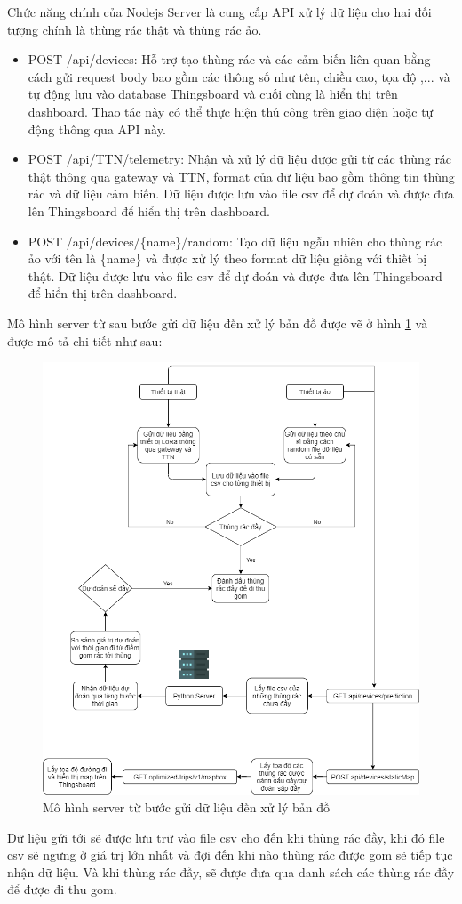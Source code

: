 Chức năng chính của Nodejs Server là cung cấp API xử lý dữ liệu cho hai đối tượng chính là thùng rác thật và thùng rác ảo.
\begin{itemize}
    \item POST /api/devices: Hỗ trợ tạo thùng rác và các cảm biến liên quan bằng cách gửi request body bao gồm các thông số như tên, chiều cao, tọa độ ,... và tự động lưu vào database Thingsboard và cuối cùng là hiển thị trên dashboard. Thao tác này có thể thực hiện thủ công trên giao diện hoặc tự động thông qua API này.
    \item POST /api/TTN/telemetry: Nhận và xử lý dữ liệu được gửi từ các thùng rác thật thông qua gateway và TTN, format của dữ liệu bao gồm thông tin thùng rác và dữ liệu cảm biến. Dữ liệu được lưu vào file csv để dự đoán và được đưa lên Thingsboard để hiển thị trên dashboard.
    \item POST /api/devices/\{name\}/random: Tạo dữ liệu ngẫu nhiên cho thùng rác ảo với tên là \{name\} và được xử lý theo format dữ liệu giống với thiết bị thật. Dữ liệu được lưu vào file csv để dự đoán và được đưa lên Thingsboard để hiển thị trên dashboard.
\end{itemize}

Mô hình server từ sau bước gửi dữ liệu đến xử lý bản đồ được vẽ ở hình \ref{fig:chart_server2} và được mô tả chi tiết như sau:
\begin{figure}[H]
    \centering
    \includegraphics[width=\textwidth]{images/Khanh/Nodejs/Chart_server2.png}
    \caption{Mô hình server từ bước gửi dữ liệu đến xử lý bản đồ}
    \label{fig:chart_server2}
\end{figure}
Dữ liệu gửi tới sẽ được lưu trữ vào file csv cho đến khi thùng rác đầy, khi đó file csv sẽ ngưng ở giá trị lớn nhất và đợi đến khi nào thùng rác được gom sẽ tiếp tục nhận dữ liệu. Và khi thùng rác đầy, sẽ được đưa qua danh sách các thùng rác đầy để được đi thu gom.

